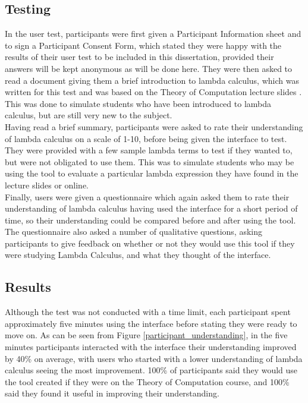 \documentclass[a4paper,11pt]{report}
\begin{document}
\subsection{Testing}

In the user test, participants were first given a Participant Information sheet and to sign a Participant Consent Form, which stated they were happy with the results of their user test to be included in this dissertation, provided their answers will be kept anonymous as will be done here. They were then asked to read a document giving them a brief introduction to lambda calculus, which was written for this test and was based on the Theory of Computation lecture slides \cite{Gay2019}. This was done to simulate students who have been introduced to lambda calculus, but are still very new to the subject.\\

Having read a brief summary, participants were asked to rate their understanding of lambda calculus on a scale of 1-10, before being given the interface to test. They were provided with a few sample lambda terms to test if they wanted to, but were not obligated to use them. This was to simulate students who may be using the tool to evaluate a particular lambda expression they have found in the lecture slides or online.\\

Finally, users were given a questionnaire which again asked them to rate their understanding of lambda calculus having used the interface for a short period of time, so their understanding could be compared before and after using the tool. The questionnaire also asked a number of qualitative questions, asking participants to give feedback on whether or not they would use this tool if they were studying Lambda Calculus, and what they thought of the interface.

\subsection{Results}
Although the test was not conducted with a time limit, each participant spent approximately five minutes using the interface before stating they were ready to move on. As can be seen from Figure \ref{participant_understanding}, in the five minutes participants interacted with the interface their understanding improved by 40\% on average, with users who started with a lower understanding of lambda calculus seeing the most improvement. 100\% of participants said they would use the tool created if they were on the Theory of Computation course, and 100\% said they found it useful in improving their understanding.\\
\end{document}

